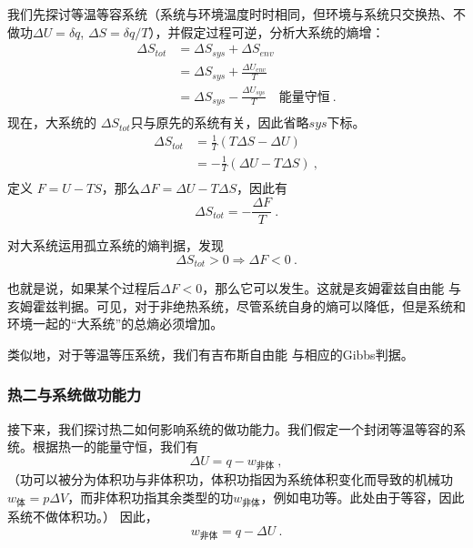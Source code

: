 我们先探讨等温等容系统（系统与环境温度时时相同，但环境与系统只交换热、不做功$\Delta U = \delta q$, $\Delta S = \delta q / T$），并假定过程可逆，分析大系统的熵增：
\begin{equation}
\begin{aligned}
\Delta {S_{tot}}
 &=\Delta {S_{sys}}+\Delta {S_{env}}\\
 & =\Delta {S_{sys}}+ \frac{\Delta U_{{env}}}{T}\\
 & = \Delta {S_{sys}} - \frac{\Delta U_{{sys}}}{T} \quad \text{能量守恒}~.\\
 \end{aligned}
\end{equation}
现在，大系统的 $\Delta {S_{tot}}$只与原先的系统有关，因此省略$sys$下标。
\begin{equation}
\begin{aligned}
\Delta {S_{tot}}
 & = \frac{1}{T}(T \Delta {S} -\Delta U )\\
 & = - \frac{1}{T}(\Delta U - T \Delta {S} )~,\\
\end{aligned}
\end{equation}
定义 $F = U-TS$，那么$\Delta F = \Delta U - T \Delta S$，因此有
\begin{equation}
\Delta S_{tot} = -\frac{\Delta F}{T}~.
\end{equation}

对大系统运用孤立系统的熵判据，发现
\begin{equation}
\Delta S_{tot} > 0\Rightarrow \Delta F < 0~.
\end{equation}

也就是说，如果某个过程后$\Delta F < 0$，那么它可以发生。这就是亥姆霍兹自由能 与 亥姆霍兹判据。可见，对于非绝热系统，尽管系统自身的熵可以降低，但是系统和环境一起的“大系统”的总熵必须增加。

类似地，对于等温等压系统，我们有吉布斯自由能 与相应的Gibbs判据。

\subsubsection{热二与系统做功能力}
接下来，我们探讨热二如何影响系统的做功能力。我们假定一个封闭等温等容的系统。根据热一的能量守恒，我们有
$$\Delta U = q - w_{\text{非体}}~,$$ （功可以被分为体积功与非体积功，体积功指因为系统体积变化而导致的机械功  $w_\text{体}=p\Delta V$，而非体积功指其余类型的功$w_\text{非体}$，例如电功等。此处由于等容，因此系统不做体积功。）
因此，
$$ w_{\text{非体}} = q - \Delta U~.$$

